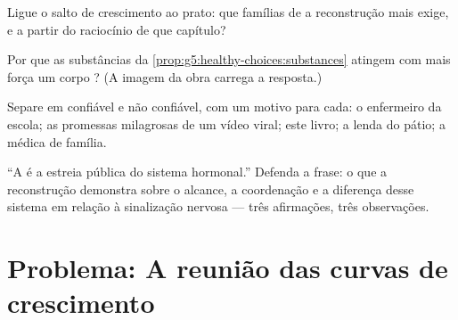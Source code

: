 \begin{exercise}[$\star\star$]\label{exo:g8:puberty:9}
Ligue o salto de crescimento ao prato: que famílias de  a
reconstrução mais exige, e a partir do raciocínio de que capítulo?
\end{exercise}

\begin{exercise}[$\star\star$]\label{exo:g8:puberty:10}
Por que as substâncias da \cref{prop:g5:healthy-choices:substances}
atingem com mais força um corpo ? (A imagem da obra carrega
a resposta.)
\end{exercise}

\begin{exercise}[$\star\star$]\label{exo:g8:puberty:11}
Separe em confiável e não confiável, com um motivo para cada: o
enfermeiro da escola; as promessas milagrosas de um vídeo viral; este
livro; a lenda do pátio; a médica de família.
\end{exercise}

\begin{exercise}[$\star\star\star$]\label{exo:g8:puberty:12}
``A  é a estreia pública do sistema hormonal.'' Defenda a
frase: o que a reconstrução demonstra sobre o alcance, a coordenação e
a diferença desse sistema em relação à sinalização nervosa --- três
afirmações, três observações.
\end{exercise}

\section{Problema: A reunião das curvas de crescimento}

